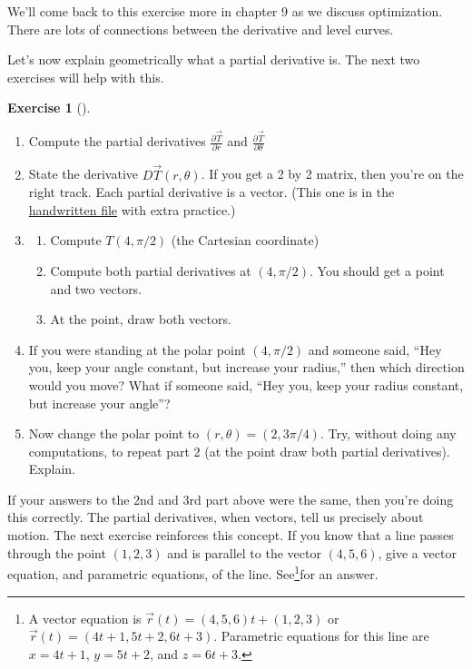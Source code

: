 \documentclass[10pt,]{book}
\theoremstyle{plain}
\theoremstyle{definition}
\theoremstyle{definition}
\theoremstyle{definition}
\theoremstyle{definition}
\newtheorem{exploration}[project]{Exercise}
\theoremstyle{definition}
\numberwithin{equation}{section}
\newcommand{\ds}{\displaystyle}
\begin{document}
We'll come back to this exercise more in chapter 9 as we discuss optimization. There are lots of connections between the derivative and level curves.%
\par
Let's now explain geometrically what a partial derivative is. The next two exercises will help with this.%
\begin{exploration}[]\label{exploration-138}
\leavevmode%
\begin{enumerate}[font=\bfseries,label=(\alph*),ref=\alph*]
\item\label{task-292} Compute the partial derivatives \(\ds\frac{\partial \vec T}{\partial r}\) and \(\ds\frac{\partial \vec T}{\partial \theta}\)%
\item\label{task-293} State the derivative \(D\vec T(r,\theta)\). If you get a 2 by 2 matrix, then you're on the right track. Each partial derivative is a vector. (This one is in the \href{http://db.tt/cSeKG8XO}{handwritten file} with extra practice.)%
%
\item\label{task-294} \begin{enumerate}[font=\bfseries,label=(\roman*),ref=\theenumi.\roman*]
\item\label{task-295} Compute \(T(4,\pi/2)\) (the Cartesian coordinate)%
\item\label{task-296} Compute both partial derivatives at \((4,\pi/2)\). You should get a point and two vectors.%
%
\item\label{task-297} At the point, draw both vectors.%
\end{enumerate}
\item\label{task-298} If you were standing at the polar point \((4,\pi/2)\) and someone said, ``Hey you, keep your angle constant, but increase your radius,'' then which direction would you move?  What if someone said, ``Hey you, keep your radius constant, but increase your angle''?%
\item\label{task-299} Now change the polar point to \((r,\theta) = (2,3\pi/4)\).  Try, without doing  any computations, to repeat part 2 (at the point draw both partial derivatives). Explain.%
\end{enumerate}
\end{exploration}
If your answers to the 2nd and 3rd part above were the same, then you're doing this correctly. The partial derivatives, when vectors, tell us precisely about motion. The next exercise reinforces this concept.%
If you know that a line passes through the point \((1,2,3)\) and is parallel to the vector \((4,5,6)\), give a vector equation, and parametric equations, of the line. See\footnote{A vector equation is \(\vec r(t) = (4,5,6)t+(1,2,3)\) or \(\vec r(t) = (4t+1, 5t+2, 6t+3)\).  Parametric equations for this line are \(x=4t+1\), \(y=5t+2\), and \(z=6t+3\).\label{fn-1}}for an answer.%
\end{document}
